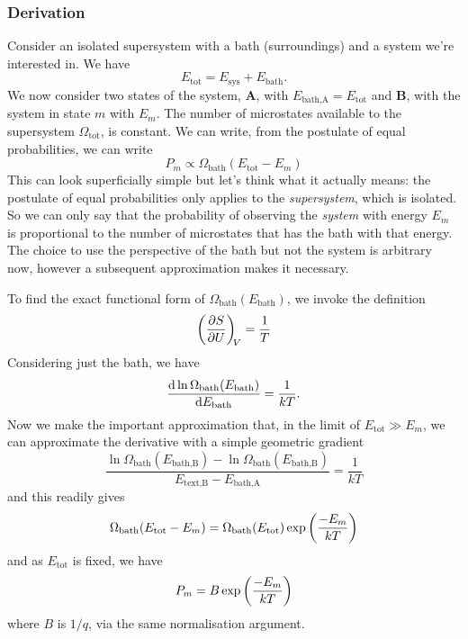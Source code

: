 \subsubsection{Derivation}
Consider an isolated supersystem with a bath (surroundings) and a system we're interested in. We have
\begin{equation}
    E_{\text{tot}}=E_{\text{sys}}+E_{\text{bath}}.
\end{equation}
We now consider two states of the system, \textbf{A}, with $E_\text{bath,A}=E_{\text{tot}}$ and \textbf{B}, with the system in state $m$ with $E_m$. 
The number of microstates available to the supersystem $\Omega_{\text{tot}}$, is constant. We can write, from the postulate of equal probabilities, we can write
\begin{equation}
    P_m\propto\Omega_{\text{bath}}(E_{\text{tot}}-E_m)
\end{equation}
This can look superficially simple but let's think what it actually means: the postulate of equal probabilities only applies to the \emph{supersystem}, which is isolated. So we can only say that the probability of observing the \emph{system} with energy $E_m$ is proportional to the number of microstates that has the bath with that energy. The choice to use the perspective of the bath but not the system is arbitrary now, however a subsequent approximation makes it necessary. \par
To find the exact functional form of $\Omega_{\text{bath}}(E_{\text{bath}})$, we invoke the definition
\begin{equation}
    \diffp SU[V]=\frac{1}{T}
\end{equation}
Considering just the bath, we have
\begin{equation}
    \diff{\ln{\Omega}_{\text{bath}}(E_{\text{bath}})}{E_{\text{bath}}}=\frac{1}{kT}.
\end{equation}
Now we make the important approximation that, in the limit of $E_{\text{tot}}\gg E_m$, we can approximate the derivative with a simple geometric gradient
\begin{equation}
    \frac{\ln \Omega_{\text{bath}}(E_{\text{bath,B}})-\ln\Omega_{\text{bath}}(E_{\text{bath,B}})}{E_{\text{text,B}}-E_{\text{bath,A}}}=\frac{1}{kT}
\end{equation}
and this readily gives 
\begin{equation}
  \Omega_{\text{bath}}(E_{\text{tot}}-E_m)=\Omega_{\text{bath}}(E_{\text{tot}})\exp\left(\frac{-E_m}{kT} \right)
\end{equation}
and as $E_{\text{tot}}$ is fixed, we have
\begin{equation}
  P_m=B\exp\left(\frac{-E_m}{kT} \right)
\end{equation}
where $B$ is $1/q$, via the same normalisation argument.

